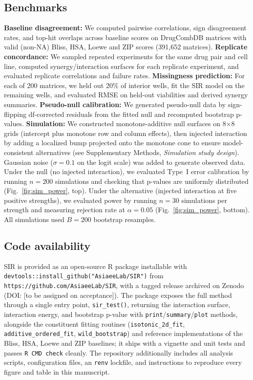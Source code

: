\documentclass[pdflatex,sn-nature]{sn-jnl}%
\begin{document}
\subsection{Benchmarks}
\textbf{Baseline disagreement:} We computed pairwise correlations, sign disagreement rates, and top-hit overlaps across baseline scores on DrugCombDB matrices with valid (non-NA) Bliss, HSA, Loewe and ZIP scores (391{,}652 matrices).
\textbf{Replicate concordance:} We sampled repeated experiments for the same drug pair and cell line, computed synergy/interaction surfaces for each replicate experiment, and evaluated replicate correlations and failure rates.
\textbf{Missingness prediction:} For each of 200 matrices, we held out 20\% of interior wells, fit the SIR model on the remaining wells, and evaluated RMSE on held-out viabilities and derived synergy summaries.
\textbf{Pseudo-null calibration:} We generated pseudo-null data by sign-flipping df-corrected residuals from the fitted null and recomputed bootstrap p-values.
\textbf{Simulation:} We constructed monotone-additive null surfaces on 8$\times$8 grids (intercept plus monotone row and column effects), then injected interaction by adding a localized bump projected onto the monotone cone to ensure model-consistent alternatives (see Supplementary Methods, \emph{Simulation study design}).
Gaussian noise ($\sigma=0.1$ on the logit scale) was added to generate observed data.
Under the null (no injected interaction), we evaluated Type~I error calibration by running $n=200$ simulations and checking that p-values are uniformly distributed (Fig.~\ref{fig:sim_power}, top).
Under the alternative (injected interaction at five positive strengths), we evaluated power by running $n=30$ simulations per strength and measuring rejection rate at $\alpha=0.05$ (Fig.~\ref{fig:sim_power}, bottom).
All simulations used $B=200$ bootstrap resamples.

\subsection{Code availability}
SIR is provided as an open-source R package installable with \texttt{devtools::install\_github("AsiaeeLab/SIR")} from \texttt{https://github.com/AsiaeeLab/SIR}, with a tagged release archived on Zenodo (DOI: [to be assigned on acceptance]).
The package exposes the full method through a single entry point, \texttt{sir\_test()}, returning the interaction surface, interaction energy, and bootstrap p-value with \texttt{print}/\texttt{summary}/\texttt{plot} methods, alongside the constituent fitting routines (\texttt{isotonic\_2d\_fit}, \texttt{additive\_ordered\_fit}, \texttt{wild\_bootstrap}) and reference implementations of the Bliss, HSA, Loewe and ZIP baselines; it ships with a vignette and unit tests and passes \texttt{R CMD check} cleanly.
The repository additionally includes all analysis scripts, configuration files, an \texttt{renv} lockfile, and instructions to reproduce every figure and table in this manuscript.
\end{document}
